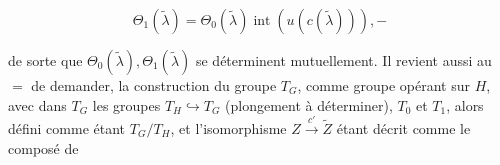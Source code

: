 \[\Theta_1(\widetilde\lambda)=\Theta_0(\widetilde\lambda)\operatorname{int}(u(c(\widetilde\lambda))),-\tag*{(136)}\]

 de sorte que $\Theta_0(\widetilde\lambda),\Theta_1(\widetilde\lambda)$ se déterminent mutuellement. Il revient aussi au $=$ de  demander,  la construction du groupe $T_G$, comme groupe opérant sur $H$, avec dans $T_G$ les groupes $T_H\hookrightarrow T_G$ (plongement à déterminer), $T_0$ et $T_1$,   alors défini    comme étant $T_G/T_H$, et l'isomorphisme $Z\xrightarrow{c'}\widetilde Z$ étant décrit comme le composé de

